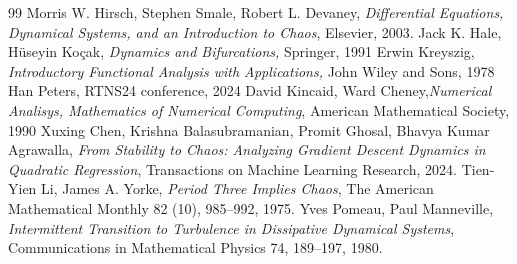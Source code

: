 \documentclass[12pt,a4paper]{report}
\theoremstyle{definition}
\begin{document}
\begin{thebibliography}{99}
     Morris W. Hirsch, Stephen Smale, Robert L. Devaney, {\em Differential Equations, Dynamical Systems, and an Introduction to Chaos}, Elsevier, 2003.
     Jack K. Hale, Hüseyin Koçak, {\em Dynamics and Bifurcations,}  Springer, 1991
     Erwin Kreyszig, {\em Introductory Functional Analysis with Applications,} John Wiley and Sons, 1978
     Han Peters, RTNS24 conference, 2024
     David Kincaid, Ward Cheney,{\em Numerical Analisys, Mathematics of Numerical Computing}, American Mathematical Society, 1990
     Xuxing Chen, Krishna Balasubramanian, Promit Ghosal, Bhavya Kumar Agrawalla, {\em From Stability to Chaos: Analyzing Gradient Descent Dynamics in Quadratic Regression}, Transactions on Machine Learning Research, 2024.
     Tien-Yien Li, James A. Yorke, {\em Period Three Implies Chaos}, The American Mathematical Monthly 82 (10), 985--992, 1975.
     Yves Pomeau, Paul Manneville, {\em Intermittent Transition to Turbulence in Dissipative Dynamical Systems}, Communications in Mathematical Physics 74, 189--197, 1980.
                \end{thebibliography}
\end{document}
